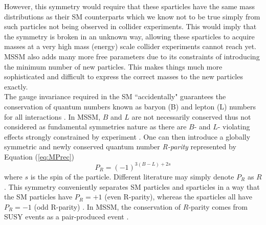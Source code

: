 However, this symmetry would require that these sparticles have the same mass distributions as their SM counterparts which we know not to be true simply from such particles not being observed in collider experiments. This would imply that the symmetry is broken in an unknown way, allowing these sparticles to acquire masses at a very high mass (energy) scale collider experiments cannot reach yet. MSSM also adds many more free parameters due to its constraints of introducing the minimum number of new particles. This makes things much more sophisticated and difficult to express the correct masses to the new particles exactly. \\

The gauge invariance required in the SM ``accidentally" \cite{martin1997supersymmetry} guarantees the conservation of quantum numbers known as baryon (B) and lepton (L) numbers for all interactions \cite{baer2006weak}. In MSSM, $B$ and $L$ are not necessarily conserved thus not considered as fundamental symmetries nature as there are $B$- and $L$- violating effects strongly constrained by experiment \cite{martin1997supersymmetry}. One can then introduce a globally symmetric and newly conserved quantum number \textit{R-parity} \cite{martin1997supersymmetry, baer2006weak} represented by Equation (\ref{eq:MPrec})
\begin{equation}
    P_R=(-1)^{3(B-L)+2s}
    \label{eq:MPrec}
\end{equation}
where $s$ is the spin of the particle. Different literature may simply denote $P_R$ \cite{martin1997supersymmetry} as $R$ \cite{baer2006weak}. This symmetry conveniently separates SM particles and sparticles in a way that the SM particles have $P_R=+1$ (even R-parity), whereas the sparticles all have $P_R=-1$ (odd R-parity) \cite{martin1997supersymmetry}. In MSSM, the conservation of $R$-parity comes from SUSY events as a pair-produced event \cite{aitchison2007supersymmetry}. \\


